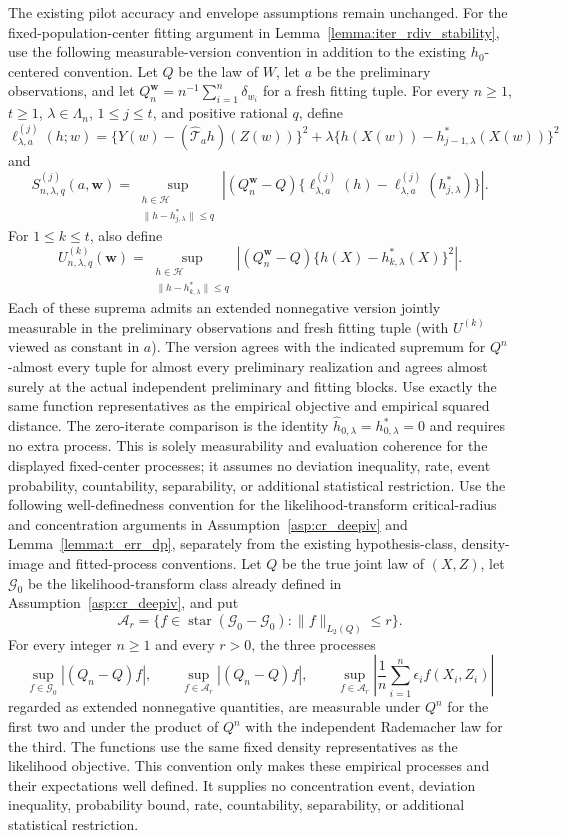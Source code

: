 \begin{lemma}
The existing pilot accuracy and envelope assumptions remain unchanged. For the fixed-population-center fitting argument in Lemma~\ref{lemma:iter_rdiv_stability}, use the following measurable-version convention in addition to the existing $h_0$-centered convention. Let $Q$ be the law of $W$, let $a$ be the preliminary observations, and let $Q_n^{\mathbf w}=n^{-1}\sum_{i=1}^n\delta_{w_i}$ for a fresh fitting tuple. For every $n\geqslant1$, $t\geqslant1$, $\lambda\in\Lambda_n$, $1\leqslant j\leqslant t$, and positive rational $q$, define \[ \ell^{(j)}_{\lambda,a}(h;w)=\{Y(w)-(\hat{\mathcal T}_a h)(Z(w))\}^2+\lambda\{h(X(w))-h_{j-1,\lambda}^*(X(w))\}^2 \] and \[ S^{(j)}_{n,\lambda,q}(a,\mathbf w)=\sup_{\substack{h\in\mathcal H\\\lVert h-h_{j,\lambda}^*\rVert\leqslant q}}\left|(Q_n^{\mathbf w}-Q)\{\ell^{(j)}_{\lambda,a}(h)-\ell^{(j)}_{\lambda,a}(h_{j,\lambda}^*)\}\right|. \] For $1\leqslant k\leqslant t$, also define \[ U^{(k)}_{n,\lambda,q}(\mathbf w)=\sup_{\substack{h\in\mathcal H\\\lVert h-h_{k,\lambda}^*\rVert\leqslant q}}\left|(Q_n^{\mathbf w}-Q)\{h(X)-h_{k,\lambda}^*(X)\}^2\right|. \] Each of these suprema admits an extended nonnegative version jointly measurable in the preliminary observations and fresh fitting tuple (with $U^{(k)}$ viewed as constant in $a$). The version agrees with the indicated supremum for $Q^n$-almost every tuple for almost every preliminary realization and agrees almost surely at the actual independent preliminary and fitting blocks. Use exactly the same function representatives as the empirical objective and empirical squared distance. The zero-iterate comparison is the identity $\hat h_{0,\lambda}=h_{0,\lambda}^*=0$ and requires no extra process. This is solely measurability and evaluation coherence for the displayed fixed-center processes; it assumes no deviation inequality, rate, event probability, countability, separability, or additional statistical restriction. Use the following well-definedness convention for the likelihood-transform critical-radius and concentration arguments in Assumption~\ref{asp:cr_deepiv} and Lemma~\ref{lemma:t_err_dp}, separately from the existing hypothesis-class, density-image and fitted-process conventions. Let $Q$ be the true joint law of $(X,Z)$, let $\mathcal G_0$ be the likelihood-transform class already defined in Assumption~\ref{asp:cr_deepiv}, and put \[ \mathcal A_r=\{f\in\operatorname{star}(\mathcal G_0-\mathcal G_0):\|f\|_{L_2(Q)}\leqslant r\}. \] For every integer $n\geqslant1$ and every $r>0$, the three processes \[ \sup_{f\in\mathcal G_0}|(Q_n-Q)f|,\qquad \sup_{f\in\mathcal A_r}|(Q_n-Q)f|,\qquad \sup_{f\in\mathcal A_r}\left|\frac1n\sum_{i=1}^n\epsilon_i f(X_i,Z_i)\right| \] regarded as extended nonnegative quantities, are measurable under $Q^n$ for the first two and under the product of $Q^n$ with the independent Rademacher law for the third. The functions use the same fixed density representatives as the likelihood objective. This convention only makes these empirical processes and their expectations well defined. It supplies no concentration event, deviation inequality, probability bound, rate, countability, separability, or additional statistical restriction.

\end{lemma}
